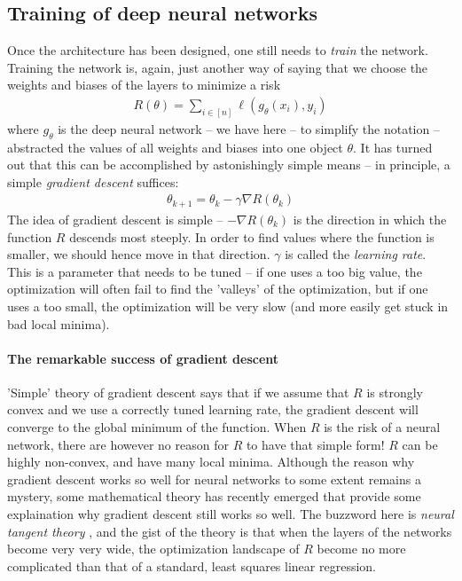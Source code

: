 \documentclass{article}
\begin{document}




\subsection{Training of deep neural networks}
Once the architecture has been designed, one still needs to \emph{train} the network. Training the network is, again, just another way of saying that we choose the weights and biases of the layers to minimize a risk
\begin{align*}
    R(\theta) = \sum_{i \in [n]} \ell(g_\theta(x_i),y_i) 
\end{align*}
where $g_\theta$ is the deep neural network -- we have here -- to simplify the notation --  abstracted the values of all weights and biases into one object $\theta$. It has turned out that this can be accomplished by astonishingly simple means -- in principle, a simple \emph{gradient descent} suffices:
\begin{align*}
    \theta_{k+1} = \theta_k - \gamma \nabla R(\theta_k)
\end{align*}
The idea of gradient descent is simple -- $-\nabla R(\theta_k)$ is the direction in which the function $R$ descends most steeply. In order to find values where the function is smaller, we should hence move in that direction. $\gamma$ is called the \emph{learning rate}. This is a parameter that needs to be tuned -- if one uses a too big value, the optimization will often fail to find the 'valleys' of the optimization, but if one uses a too small, the optimization will be very slow (and more easily get stuck in bad local minima). 


\paragraph{The remarkable success of gradient descent}
'Simple' theory of gradient descent says that if we assume that $R$ is strongly convex and we use a correctly tuned learning rate, the gradient descent will converge to the global minimum of the function. When $R$ is the risk of a neural network, there are however no reason for $R$ to have that simple form! $R$ can be highly non-convex, and have many local minima. Although the reason why gradient descent works so well for neural networks to some extent remains a mystery, some mathematical theory has recently emerged that provide some explaination why gradient descent still works so well. The buzzword here is \emph{neural tangent theory} \cite{jacot2018neural}, and the gist of the theory is that when the layers of the networks become very very wide, the optimization landscape of $R$ become no more complicated than that of a standard, least squares linear regression. 
\end{document}

